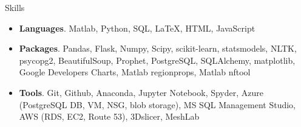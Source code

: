\documentclass{resume} %
\begin{document}
	\begin{rSection}{Skills}
		\begin{itemize}[leftmargin=0em]
			\item {\bf Languages}{. Matlab, Python, SQL, LaTeX, HTML, JavaScript}
			\item {\bf Packages}{. Pandas, Flask, Numpy, Scipy, scikit-learn, statsmodels, NLTK, psycopg2, BeautifulSoup, Prophet, PostgreSQL, SQLAlchemy, matplotlib, Google Developers Charts, Matlab regionprops, Matlab nftool}
			\item {\bf Tools}{. Git, Github, Anaconda, Jupyter Notebook, Spyder, Azure (PostgreSQL DB, VM, NSG, blob storage), MS SQL Management Studio, AWS (RDS, EC2, Route 53), 3Dslicer, MeshLab}
			
		\end{itemize}
	\end{rSection}
	
\end{document}
